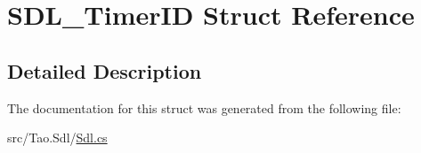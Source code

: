 \hypertarget{struct_s_d_l___timer_i_d}{
\section{SDL\_\-TimerID Struct Reference}
\label{struct_s_d_l___timer_i_d}
}


\subsection{Detailed Description}


The documentation for this struct was generated from the following file:\begin{DoxyCompactItemize}
\item 
src/Tao.Sdl/\hyperlink{_sdl_8cs}{Sdl.cs}\end{DoxyCompactItemize}
